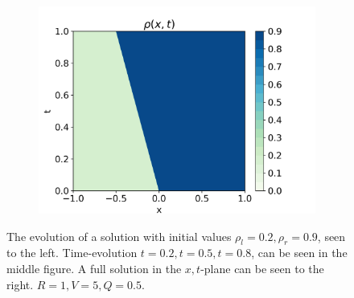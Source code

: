 \documentclass[10pt]{article}
\numberwithin{equation}{section}
\begin{document}
\begin{figure}
     \hfill
     \begin{subfigure}[b]{0.3\textwidth}
         \centering
         \includegraphics[width=\textwidth]{Figures/Model/Plots/BackwShockFull.png}
     \end{subfigure}
        \caption{The evolution of a solution with initial values $\rho_l = 0.2, \rho_r = 0.9$, seen to the left. Time-evolution $t = 0.2, t = 0.5, t = 0.8$, can be seen in the middle figure. A full solution in the $x,t$-plane can be seen to the right. $R = 1, V = 5, Q = 0.5$.}
        \label{fig:ExampleBackwardsShock}
\end{figure}
\end{document}
